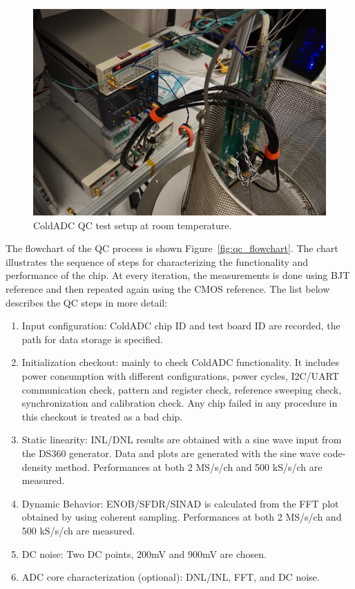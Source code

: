 \begin{figure}[h!]
\centering
  \includegraphics[width=0.7\linewidth]{figures/prod_warmsetup.png}
  \caption{ColdADC QC test setup at room temperature.}
  \label{fig:prod_warmsetup}
\end{figure}

The flowchart of the QC process is shown Figure~\ref{fig:qc_flowchart}.  The chart illustrates the sequence of steps for characterizing 
the functionality and performance of the chip. At every iteration, the measurements is done using BJT reference and then repeated 
again using the CMOS reference. 
The list below describes the QC steps in more detail: 
\begin{enumerate}
\item Input configuration: ColdADC chip ID and test board ID are recorded, the path for data storage is specified. 
\item Initialization checkout: mainly to check ColdADC functionality. It includes power consumption with different 
configurations, power cycles, I2C/UART communication check, pattern and register check, reference sweeping check, 
synchronization and calibration check. Any chip failed in any procedure in this checkout is treated as a bad chip. 
\item  Static linearity: INL/DNL results are obtained with a sine wave input from the DS360 generator. Data and plots 
are generated with the sine wave code-density method. Performances at both 2 MS/s/ch and 500 kS/s/ch are measured.
\item Dynamic Behavior: ENOB/SFDR/SINAD is calculated from the FFT plot obtained by using coherent sampling. 
Performances at both 2 MS/s/ch and 500 kS/s/ch are measured. 
\item DC noise: Two DC points, 200mV and 900mV are chosen.
\item ADC core characterization (optional): DNL/INL, FFT, and DC noise. 
\end{enumerate}

